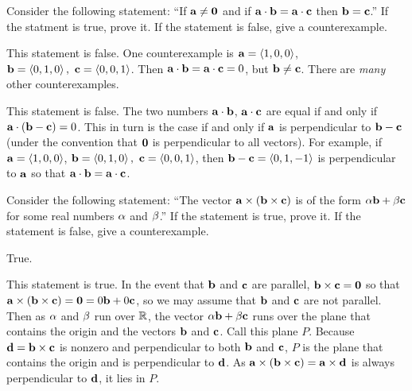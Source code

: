 \begin{question}
Consider the following statement: ``If $\mathbf{a}\ne\mathbf{0}$
and if $\mathbf{a}\cdot\mathbf{b}=\mathbf{a}\cdot\mathbf{c}$ then $\mathbf{b}=\mathbf{c}$.''
If the statment is true, prove it. If the statement is false, give a 
counterexample.
\end{question}

%

\begin{answer}
This statement is false. One counterexample is $\mathbf{a}=\left< 1,0,0\right> $,
$\mathbf{b}=\left< 0,1,0\right> ,\ \mathbf{c}=\left< 0,0,1\right> $. Then $\mathbf{a}\cdot\mathbf{b}=\mathbf{a}\cdot\mathbf{c}=0$, but $\mathbf{b}\ne\mathbf{c}$. There are \emph{many} other counterexamples.
\end{answer}

\begin{solution}
This statement is false. The two numbers 
$\mathbf{a}\cdot\mathbf{b}$, $\mathbf{a}\cdot\mathbf{c}$ are equal if and only if
$\mathbf{a}\cdot(\mathbf{b}-\mathbf{c})= 0$. This in turn is the case if and only
if $\mathbf{a}$ is perpendicular to $\mathbf{b}-\mathbf{c}$ (under the convention that
$\mathbf{0}$ is perpendicular to all vectors). For example, 
if $\mathbf{a}=\left< 1,0,0\right> $, $\mathbf{b}=\left< 0,1,0\right> ,\ \mathbf{c}=\left< 0,0,1\right> $, then $\mathbf{b}-\mathbf{c}=\left< 0,1,-1\right>$ is perpendicular to $\mathbf{a}$ so that 
$\mathbf{a}\cdot\mathbf{b}=\mathbf{a}\cdot\mathbf{c}$.
\end{solution}

\begin{question}\label{PRB Qnine}
Consider the following statement: ``The vector $\mathbf{a}\times(\mathbf{b}\times\mathbf{c})$ 
is of the form $\alpha\mathbf{b}+\beta\mathbf{c}$ for some real numbers $\alpha$ and $\beta$.''
If the statement is true, prove it. If the statement is false, give a 
counterexample.

\end{question}


\begin{answer}
True.
\end{answer}

\begin{solution}
This statement is true. In the event that $\mathbf{b}$ and 
$\mathbf{c}$ are parallel, $\mathbf{b}\times\mathbf{c}=\mathbf{0}$ so that
$\mathbf{a}\times(\mathbf{b}\times\mathbf{c})=\mathbf{0}=0\mathbf{b}+0\mathbf{c}$, so we may assume
that $\mathbf{b}$ and $\mathbf{c}$ are not parallel. Then as $\alpha$ and $\beta$ run
over $\mathbb{R}$, the vector $\alpha\mathbf{b}+\beta \mathbf{c}$ runs over the plane that
contains the origin and the vectors $\mathbf{b}$ and $\mathbf{c}$. Call this plane
$P$. Because
$\mathbf{d}=\mathbf{b}\times\mathbf{c}$ is nonzero and perpendicular to both 
$\mathbf{b}$ and $\mathbf{c}$, $P$ is the plane that contains the origin
and is perpendicular to $\mathbf{d}$. As $\mathbf{a}\times(\mathbf{b}\times\mathbf{c})=\mathbf{a}\times\mathbf{d}$ is always perpendicular to $\mathbf{d}$, it lies in $P$.
\end{solution}

